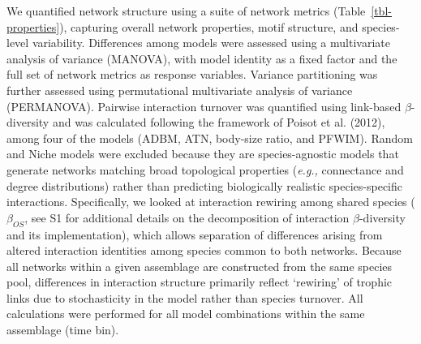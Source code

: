 \documentclass[
]{article}
\begin{document}
We quantified network structure using a suite of network metrics
(Table~\ref{tbl-properties}), capturing overall network properties,
motif structure, and species-level variability. Differences among models
were assessed using a multivariate analysis of variance (MANOVA), with
model identity as a fixed factor and the full set of network metrics as
response variables. Variance partitioning was further assessed using
permutational multivariate analysis of variance (PERMANOVA). Pairwise
interaction turnover was quantified using link-based \(\beta\)-diversity
and was calculated following the framework of Poisot et al. (2012),
among four of the models (ADBM, ATN, body-size ratio, and PFWIM). Random
and Niche models were excluded because they are species-agnostic models
that generate networks matching broad topological properties
(\emph{e.g.,} connectance and degree distributions) rather than
predicting biologically realistic species-specific interactions.
Specifically, we looked at interaction rewiring among shared species
(\(\beta_{OS}\), see S1 for additional details on the decomposition of
interaction \(\beta\)-diversity and its implementation), which allows
separation of differences arising from altered interaction identities
among species common to both networks. Because all networks within a
given assemblage are constructed from the same species pool, differences
in interaction structure primarily reflect `rewiring' of trophic links
due to stochasticity in the model rather than species turnover. All
calculations were performed for all model combinations within the same
assemblage (time bin).
\end{document}
